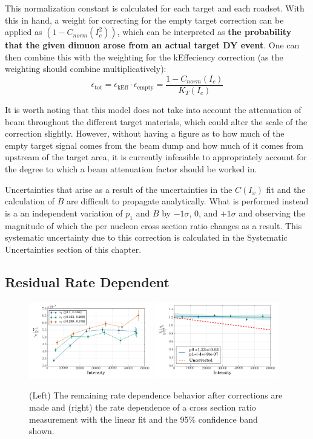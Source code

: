 This normalization constant is calculated for each target and each roadset. With this in hand, a weight for correcting for the empty target correction can be applied as $(1 - C_{norm}(I_c^2))$, which can be interpreted as \textbf{the probability that the given dimuon arose from an actual target DY event}. One can then combine this with the weighting for the kEffeciency correction (as the weighting should combine multiplicatively):
\begin{equation}
\epsilon_{\text{tot}} = \epsilon_{\text{kEff}} \cdot \epsilon_{\text{empty}} = \frac{1 - C_{norm}(I_c)}{K_T(I_c)}
\end{equation}

It is worth noting that this model does not take into account the attenuation of beam throughout the different target materials, which could alter the scale of the correction slightly. However, without having a figure as to how much of the empty target signal comes from the beam dump and how much of it comes from upstream of the target area, it is currently infeasible to appropriately account for the degree to which a beam attenuation factor should be worked in.

Uncertainties that arise as a result of the uncertainties in the $C(I_x)$ fit and the calculation of $B$ are difficult to propagate analytically. What is performed instead is a an independent variation of $p_1$ and $B$ by $-1\sigma$, 0, and $+1\sigma$ and observing the magnitude of which the per nucleon cross section ratio changes as a result. This systematic uncertainty due to this correction is calculated in the Systematic Uncertainties section of this chapter.

\subsection{Residual Rate Dependent}

\begin{figure}
	\centering
	\includegraphics[width=0.48\textwidth]{figures/analysis/rate-dep-x2-after-corr.png}
	\includegraphics[width=0.48\textwidth]{figures/analysis/remaining-rate-dep.png}
	\caption{(Left) The remaining rate dependence behavior after corrections are made and (right) the rate dependence of a cross section ratio measurement with the linear fit and the 95\% confidence band shown.}
	\label{fig:residual-rate-dep}
\end{figure}

